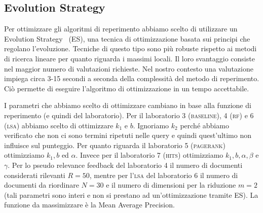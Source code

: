 \subsection{Evolution Strategy}
\label{sec:es}

Per ottimizzare gli algoritmi di reperimento abbiamo scelto di utilizzare un Evolution Strategy~\cite{back1996evolutionary} (ES), una tecnica di ottimizzazione basata sui principi che regolano l'evoluzione. Tecniche di questo tipo sono pi\`u robuste rispetto ai metodi di ricerca lineare per quanto riguarda i massimi locali. Il loro svantaggio consiste nel maggior numero di valutazioni richieste. Nel nostro contesto una valutazione impiega circa 3-15 secondi a seconda della complessit\`a del metodo di reperimento. Ci\`o permette di eseguire l'algoritmo di ottimizzazione in un tempo accettabile.

I parametri che abbiamo scelto di ottimizzare cambiano in base alla funzione di reperimento (e quindi del laboratorio). Per il laboratorio 3 (\textsc{baseline}), 4 (\textsc{rf}) e 6 (\textsc{lsa}) abbiamo scelto di ottimizzare $k_1$ e $b$. Ignoriamo $k_2$ perch\'e abbiamo verificato che non ci sono termini ripetuti nelle query e quindi  quest'ultimo non influisce sul punteggio. Per quanto riguarda il laboratorio 5 (\textsc{pagerank}) ottimizziamo $k_1, b$ ed $\alpha$. Invece per il laboratorio 7 (\textsc{hits}) ottimizziamo $k_1, b, \alpha, \beta$ e $\gamma$. Per lo pseudo relevance feedback del laboratorio 4 il numero di documenti considerati rilevanti $R = 50$, mentre per l'\textsc{lsa} del laboratorio 6 il numero di documenti da riordinare $N = 30$ e il numero di dimensioni per la riduzione $m=2$ (tali parametri sono interi e non si prestano ad un'ottimizzazione tramite ES). La funzione da massimizzare \`e la Mean Average Precision.

